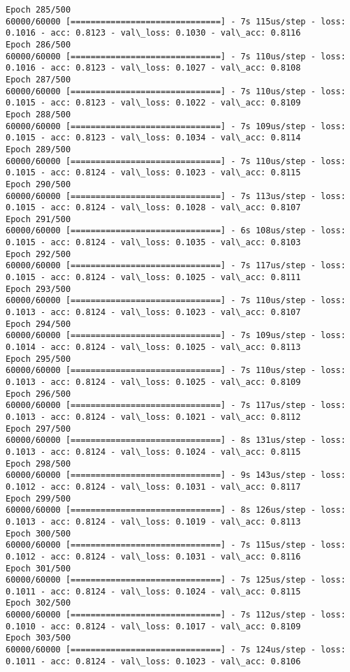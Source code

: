 \documentclass[11pt]{article}
\begin{document}
\begin{Verbatim}[commandchars=\\\{\}]
Epoch 285/500
60000/60000 [==============================] - 7s 115us/step - loss: 0.1016 - acc: 0.8123 - val\_loss: 0.1030 - val\_acc: 0.8116
Epoch 286/500
60000/60000 [==============================] - 7s 110us/step - loss: 0.1016 - acc: 0.8123 - val\_loss: 0.1027 - val\_acc: 0.8108
Epoch 287/500
60000/60000 [==============================] - 7s 110us/step - loss: 0.1015 - acc: 0.8123 - val\_loss: 0.1022 - val\_acc: 0.8109
Epoch 288/500
60000/60000 [==============================] - 7s 109us/step - loss: 0.1015 - acc: 0.8123 - val\_loss: 0.1034 - val\_acc: 0.8114
Epoch 289/500
60000/60000 [==============================] - 7s 110us/step - loss: 0.1015 - acc: 0.8124 - val\_loss: 0.1023 - val\_acc: 0.8115
Epoch 290/500
60000/60000 [==============================] - 7s 113us/step - loss: 0.1015 - acc: 0.8124 - val\_loss: 0.1028 - val\_acc: 0.8107
Epoch 291/500
60000/60000 [==============================] - 6s 108us/step - loss: 0.1015 - acc: 0.8124 - val\_loss: 0.1035 - val\_acc: 0.8103
Epoch 292/500
60000/60000 [==============================] - 7s 117us/step - loss: 0.1015 - acc: 0.8124 - val\_loss: 0.1025 - val\_acc: 0.8111
Epoch 293/500
60000/60000 [==============================] - 7s 110us/step - loss: 0.1013 - acc: 0.8124 - val\_loss: 0.1023 - val\_acc: 0.8107
Epoch 294/500
60000/60000 [==============================] - 7s 109us/step - loss: 0.1014 - acc: 0.8124 - val\_loss: 0.1025 - val\_acc: 0.8113
Epoch 295/500
60000/60000 [==============================] - 7s 110us/step - loss: 0.1013 - acc: 0.8124 - val\_loss: 0.1025 - val\_acc: 0.8109
Epoch 296/500
60000/60000 [==============================] - 7s 117us/step - loss: 0.1013 - acc: 0.8124 - val\_loss: 0.1021 - val\_acc: 0.8112
Epoch 297/500
60000/60000 [==============================] - 8s 131us/step - loss: 0.1013 - acc: 0.8124 - val\_loss: 0.1024 - val\_acc: 0.8115
Epoch 298/500
60000/60000 [==============================] - 9s 143us/step - loss: 0.1012 - acc: 0.8124 - val\_loss: 0.1031 - val\_acc: 0.8117
Epoch 299/500
60000/60000 [==============================] - 8s 126us/step - loss: 0.1013 - acc: 0.8124 - val\_loss: 0.1019 - val\_acc: 0.8113
Epoch 300/500
60000/60000 [==============================] - 7s 115us/step - loss: 0.1012 - acc: 0.8124 - val\_loss: 0.1031 - val\_acc: 0.8116
Epoch 301/500
60000/60000 [==============================] - 7s 125us/step - loss: 0.1011 - acc: 0.8124 - val\_loss: 0.1024 - val\_acc: 0.8115
Epoch 302/500
60000/60000 [==============================] - 7s 112us/step - loss: 0.1010 - acc: 0.8124 - val\_loss: 0.1017 - val\_acc: 0.8109
Epoch 303/500
60000/60000 [==============================] - 7s 124us/step - loss: 0.1011 - acc: 0.8124 - val\_loss: 0.1023 - val\_acc: 0.8106

\end{Verbatim}
\end{document}
